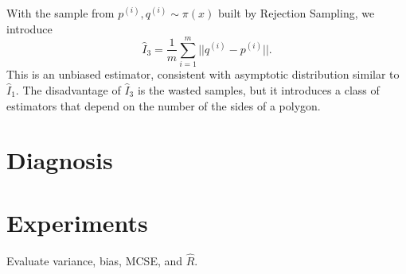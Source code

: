\documentclass[a4paper,10pt, notitlepage]{report}
\begin{document}
With the sample from $p^{(i)}, q^{(i)} \sim \pi(x)$ built by Rejection Sampling, we
introduce 
$$
\hat{I}_3 = \frac{1}{m} \sum_{i=1}^m ||q^{(i)} - p^{(i)}||. 
$$
This is an unbiased estimator, consistent with asymptotic distribution 
similar to $\hat{I}_1$. The disadvantage of $\hat{I}_3$ is the wasted samples,
but it introduces a class of estimators that depend on the number of the sides
of a polygon. 

\section*{Diagnosis}

\section*{Experiments}

Evaluate variance, bias, MCSE, and $\hat{R}$. 



\end{document}
